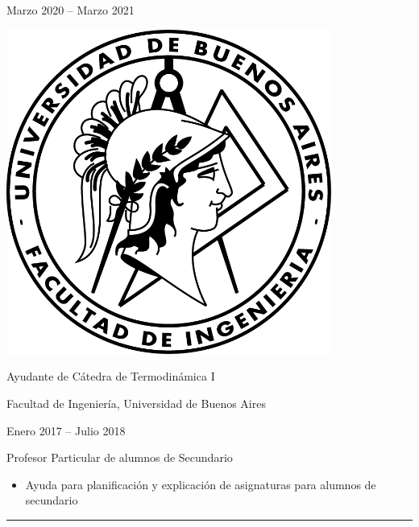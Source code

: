 \documentclass[a4paper,10pt]{article}
\newlength{\cvcolumngapwidth}
\newlength{\cvleftcolumnwidth}
\newlength{\cvrightcolumnwidth}
\newcommand{\cvsectionstyle}[1]{{\normalsize\cvsectionfont\textcolor{cvsectioncolor}{#1}}}
\newcommand{\cvtitlestyle}[1]{{\large\cvtitlefont\textcolor{cvtitlecolor}{#1}}}
\newcommand{\cvdurationstyle}[1]{{\small\cvdurationfont\textcolor{cvdurationcolor}{#1}}}
\newlength{\cvafteritemskipamount}
\newlength{\cvaftersectionskipamount}
\newlength{\cvaftertitleskipamount}
\newlength{\cvparskip}
\newcommand{\cvsection}[1]{
    \begin{minipage}[t]{\cvleftcolumnwidth}
        \raggedleft\cvsectionstyle{#1}
    \end{minipage}%
    \hspace{\cvcolumngapwidth}%
    \begin{minipage}[t]{\cvrightcolumnwidth}
        \textcolor{cvrulecolor}{\rule{\cvrightcolumnwidth}{0.3mm}}
    \end{minipage}

    \vspace{\cvaftersectionskipamount}
}
\newcommand{\cvitem}[2]{
    \begin{minipage}[t]{\cvleftcolumnwidth}
        \raggedleft #1
    \end{minipage}%
    \hspace{\cvcolumngapwidth}%
    \begin{minipage}[t]{\cvrightcolumnwidth}
        \setlength{\parskip}{\cvparskip} #2
    \end{minipage}

    \vspace{\cvafteritemskipamount}
}
\newcommand{\cvtitle}[1]{
    \cvtitlestyle{#1}

    \vspace{\cvaftertitleskipamount}
    \vspace{-\cvparskip}
}
\begin{document}
\cvitem{
    \cvdurationstyle{Marzo 2020 -- Marzo 2021}
}{
    \begin{minipage}{0.1\textwidth}
        \centering
        \includegraphics[width=0.8\textwidth]{../logos-photos/Logo_FIUBA.png}   
    \end{minipage}
    \cvtitle{Ayudante de Cátedra de Termodinámica I}

    Facultad de Ingeniería, Universidad de Buenos Aires
}

\cvitem{
    \cvdurationstyle{Enero 2017 -- Julio 2018}
}{
    \cvtitle{Profesor Particular de alumnos de Secundario}

    \begin{itemize}[leftmargin=*]
        \item Ayuda para planificación y explicación de asignaturas para alumnos de secundario
    \end{itemize}
}



\cvsection{EDUCACIÓN}
\end{document}
